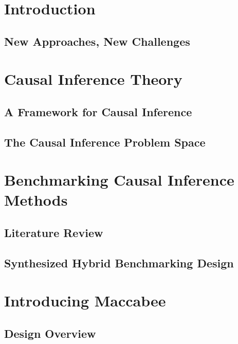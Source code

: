 \documentclass[oneside, fleqn]{book}
\begin{document}
 
\frontmatter


\clearpage
\thispagestyle{empty}

\tableofcontents
 
\mainmatter
\part{Introduction}

\chapter{New Approaches, New Challenges}



\part{Causal Inference Theory}

\chapter{A Framework for Causal Inference} \label{chap:framework}


\chapter{The Causal Inference Problem Space}



\part{Benchmarking Causal Inference Methods}
\chapter{Literature Review}


\chapter{Synthesized Hybrid Benchmarking Design}

 
\part{Introducing Maccabee}
\chapter{Design Overview}


\backmatter

 
\end{document}
